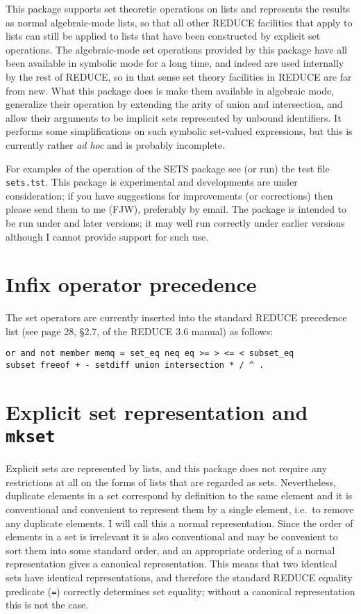This package supports set theoretic operations on lists and represents
the results as normal algebraic-mode lists, so that all other REDUCE
facilities that apply to lists can still be applied to lists that have
been constructed by explicit set operations.  The algebraic-mode set
operations provided by this package have all been available in
symbolic mode for a long time, and indeed are used internally by the
rest of REDUCE, so in that sense set theory facilities in REDUCE are
far from new.  What this package does is make them available in
algebraic mode, generalize their operation by extending the arity of
union and intersection, and allow their arguments to be implicit sets
represented by unbound identifiers.  It performs some simplifications
on such symbolic set-valued expressions, but this is currently rather
{\it ad hoc\/} and is probably incomplete.

For examples of the operation of the SETS package see (or run) the
test file {\tt sets.tst}.  This package is experimental and
developments are under consideration; if you have suggestions for
improvements (or corrections) then please send them to me (FJW),
preferably by email.  The package is intended to be run under
 and later versions; it may well run correctly under earlier
versions although I cannot provide support for such use.


\section{Infix operator precedence}

The set operators are currently inserted into the standard REDUCE
precedence list (see page 28, \S2.7, of the REDUCE 3.6 manual) as
follows:
\begin{verbatim}
or and not member memq = set_eq neq eq >= > <= < subset_eq
subset freeof + - setdiff union intersection * / ^ .
\end{verbatim}


\section{Explicit set representation and {\tt mkset}}

Explicit sets are represented by lists, and this package does not
require any restrictions at all on the forms of lists that are
regarded as sets.  Nevertheless, duplicate elements in a set
correspond by definition to the same element and it is conventional
and convenient to represent them by a single element, i.e.\ to remove
any duplicate elements.  I will call this a normal representation.
Since the order of elements in a set is irrelevant it is also
conventional and may be convenient to sort them into some standard
order, and an appropriate ordering of a normal representation gives a
canonical representation.  This means that two identical sets have
identical representations, and therefore the standard REDUCE equality
predicate ({\tt =}) correctly determines set equality; without a
canonical representation this is not the case.

